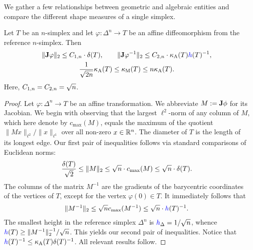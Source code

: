 \documentclass[10pt,a4paper]{article}
\begin{document}
We gather a few relationships between geometric and algebraic entities and compare the different shape measures of a single simplex.

\begin{lemma}\label{lemma:measurerelationships}
    Let $T$ be an $n$-simplex and let $\varphi : \Delta^{n} \rightarrow T$ be an affine diffeomorphism from the reference $n$-simplex. Then 
    \begin{gather*} %
        \matnorm{ \Jacobian \varphi } 
        \leq 
        \Ceins{n} \cdot \diam(T),
        \qquad 
        \matnorm{ \Jacobian \varphi^{-1} } 
        \leq 
        \Czwei{n} \cdot \aspectratio(T) \height(T)^{-1}
        ,
        \\
        \frac{1}{\sqrt{2n}} \aspectratio(T) \leq \algebraicshapemeasure(T) \leq n \aspectratio(T).
    \end{gather*}
    Here, $C_{1,n} = C_{2,n} = \sqrt n$. 
\end{lemma}
\begin{proof}
    Let $\varphi : \Delta^{n} \rightarrow T$ be an affine transformation. 
    We abbreviate $M := {\mathbf{J}}\phi$ for its Jacobian. 
    We begin with observing that the largest $\ell^{2}$-norm of any column of $M$,
    which here denote by $c_{\max}(M)$, 
    equals the maximum of the quotient $\| M x \|_{\ell^{2}} / \| x \|_{\ell^{1}}$ over all non-zero $x \in {\mathbb R}^{n}$. 
    The diameter of $T$ is the length of its longest edge. 
    Our first pair of inequalities follows via standard comparisons of Euclidean norms:
    \begin{align*}
        \frac{{\delta}(T)}{\sqrt 2} \leq \|  M  \|_{2} \leq \sqrt{n} \cdot c_{\max}(M) \leq \sqrt{n} \cdot {\delta}(T).
    \end{align*}
    The columns of the matrix $M^{-1}$ are the gradients of the barycentric coordinates of the vertices of $T$,
    except for the vertex $\varphi(0) \in T$. It immediately follows that 
    \begin{align*}
        \matnorm{ M^{-1} } \leq \sqrt{n} c_{\max}(M^{-1}) \leq \sqrt{n} \cdot \height(T)^{-1}
        .
    \end{align*}
    The smallest height in the reference simplex $\Delta^{n}$ is $\height_{\Delta} = 1/\sqrt{n}$, 
    whence $\height(T) \geq \matnorm{M^{-1}}^{-1} / \sqrt{n}$. This yields our second pair of inequalities. 
    Notice that $\height(T)^{-1} \leq \aspectratio(T) \diam(T)^{-1}$.
    All relevant results follow.
\end{proof}
\end{document}
